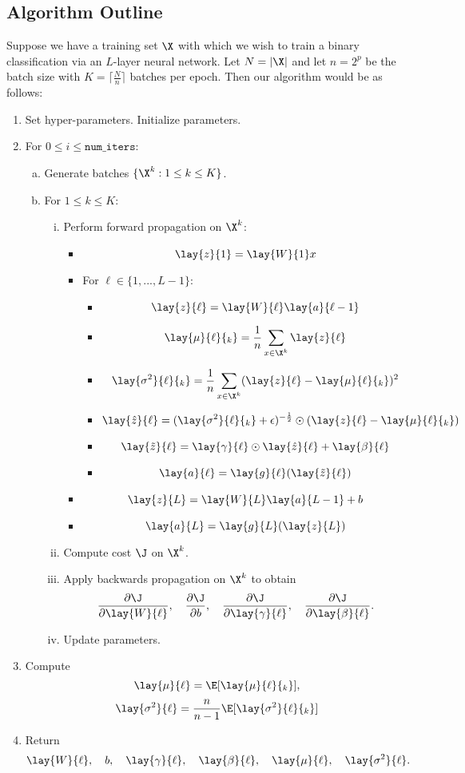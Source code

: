 \subsection{Algorithm Outline}
Suppose we have a training set $\X$ with which we wish to train a binary classification via an $L$-layer neural network.  Let $N=|\X|$ and let $n=2^p$ be the batch size with $K=\lceil\frac{N}{n}\rceil$ batches per epoch.  Then our algorithm would be as follows:
\begin{enumerate}[1.]
	\item Set hyper-parameters. Initialize parameters.
	\item For $0\leq i\leq\texttt{num\_iters}$:
	\begin{enumerate}[a.]
		\item Generate batches $\{\X^k:1\leq k\leq K\}$.
		\item For $1\leq k\leq K$:
		\begin{enumerate}[i.]
			\item Perform forward propagation on $\X^k$:
			\begin{itemize}
				\item $$\lay{z}{1}=\lay{W}{1}x$$
				\item For $\ell\in\{1,...,L-1\}$:
				\begin{itemize}
					\item $$\lay{z}{\ell}=\lay{W}{\ell}\lay{a}{\ell-1}$$
					\item $$\lay{\mu}{\ell}{_k}=\frac{1}{n}\sum_{x\in\X^k}\lay{z}{\ell}$$
					\item $$\lay{\sigma^2}{\ell}{_k}=\frac{1}{n}\sum_{x\in\X^k}(\lay{z}{\ell}-\lay{\mu}{\ell}{_k})^2$$
					\item $$\lay{\hat{z}}{\ell}=(\lay{\sigma^2}{\ell}{_k}+\epsilon)^{-\frac{1}{2}}\odot(\lay{z}{\ell}-\lay{\mu}{\ell}{_k})$$
					\item $$\lay{\tilde{z}}{\ell}=\lay{\gamma}{\ell}\odot\lay{\hat{z}}{\ell}+\lay{\beta}{\ell}$$
					\item $$\lay{a}{\ell}=\lay{g}{\ell}(\lay{\tilde{z}}{\ell})$$
				\end{itemize}
				\item $$\lay{z}{L}=\lay{W}{L}\lay{a}{L-1}+b$$
				\item $$\lay{a}{L}=\lay{g}{L}(\lay{z}{L})$$
			\end{itemize}
			\item Compute cost $\J$ on $\X^k$.
			\item Apply backwards propagation on $\X^k$ to obtain
			$$\frac{\partial\J}{\partial\lay{W}{\ell}},\quad\frac{\partial\J}{\partial b},\quad\frac{\partial\J}{\partial\lay{\gamma}{\ell}},\quad\frac{\partial\J}{\partial\lay{\beta}{\ell}}.$$
			\item Update parameters.
		\end{enumerate}
	\end{enumerate}
	\item Compute
	$$\lay{\mu}{\ell}=\E[\lay{\mu}{\ell}{_k}],$$
	$$\lay{\sigma^2}{\ell}=\frac{n}{n-1}\E[\lay{\sigma^2}{\ell}{_k}]$$
	\item Return
	$$\lay{W}{\ell},\quad b,\quad\lay{\gamma}{\ell},\quad\lay{\beta}{\ell},\quad\lay{\mu}{\ell},\quad\lay{\sigma^2}{\ell}.$$
\end{enumerate}
